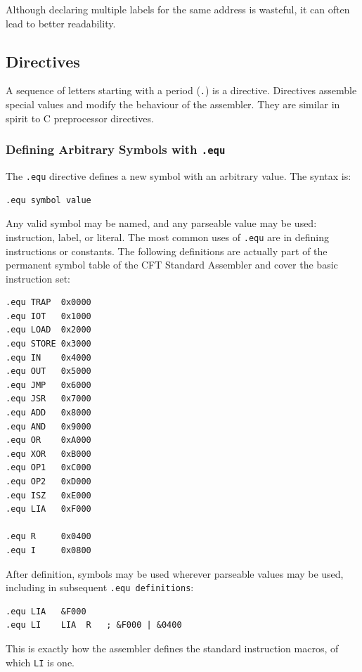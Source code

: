 \documentclass[11pt,a4paper,twocolumns]{article}
\newcommand\op[1]{\texttt{#1}}
\newcommand\f[1]{{\color{black}\texttt{#1}}}
\begin{document}
Although declaring multiple labels for the same address is wasteful, it can
often lead to better readability.

\subsection{Directives}

A sequence of letters starting with a period (\f{.}) is a directive. Directives
assemble special values and modify the behaviour of the assembler. They are
similar in spirit to C preprocessor directives.



\subsubsection{Defining Arbitrary Symbols with \f{.equ}}

The \f{.equ} directive defines a new symbol with an arbitrary value. The syntax is:

\begin{verbatim}
.equ symbol value
\end{verbatim}

Any valid symbol may be named, and any parseable value may be used:
instruction, label, or literal. The most common uses of \f{.equ} are in
defining instructions or constants. The following definitions are actually part
of the permanent symbol table of the CFT Standard Assembler and cover the basic
instruction set:

\begin{verbatim}
.equ TRAP  0x0000
.equ IOT   0x1000
.equ LOAD  0x2000
.equ STORE 0x3000
.equ IN    0x4000
.equ OUT   0x5000
.equ JMP   0x6000
.equ JSR   0x7000
.equ ADD   0x8000
.equ AND   0x9000
.equ OR    0xA000
.equ XOR   0xB000
.equ OP1   0xC000
.equ OP2   0xD000
.equ ISZ   0xE000
.equ LIA   0xF000

.equ R     0x0400
.equ I     0x0800
\end{verbatim}

After definition, symbols may be used wherever parseable values may be used,
including in subsequent \f{.equ definitions}:

\begin{verbatim}
.equ LIA   &F000
.equ LI    LIA  R   ; &F000 | &0400
\end{verbatim}

This is exactly how the assembler defines the standard instruction macros, of
which \op{LI} is one.
\end{document}
